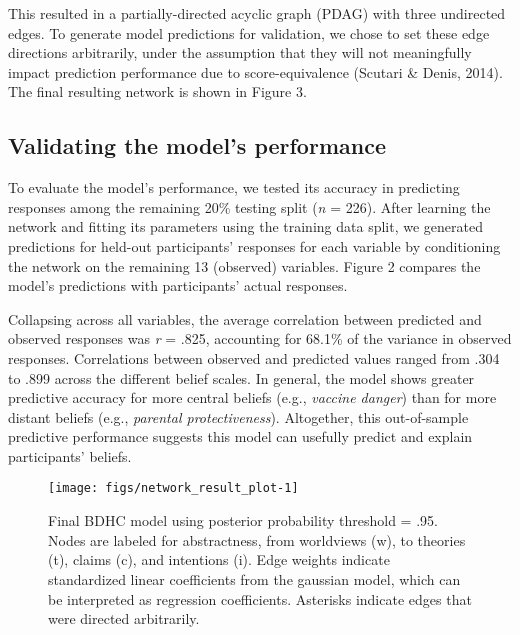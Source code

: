 \documentclass[10pt, letterpaper]{article}
\newenvironment{CodeChunk}{}{}
\begin{document}
This resulted in a partially-directed acyclic graph (PDAG) with three
undirected edges. To generate model predictions for validation, we chose
to set these edge directions arbitrarily, under the assumption that they
will not meaningfully impact prediction performance due to
score-equivalence (Scutari \& Denis, 2014). The final resulting network
is shown in Figure 3.

\subsection{Validating the model's
performance}\label{validating-the-models-performance}

To evaluate the model's performance, we tested its accuracy in
predicting responses among the remaining 20\% testing split (\emph{n} =
226). After learning the network and fitting its parameters using the
training data split, we generated predictions for held-out participants'
responses for each variable by conditioning the network on the remaining
13 (observed) variables. Figure 2 compares the model's predictions with
participants' actual responses.

Collapsing across all variables, the average correlation between
predicted and observed responses was \emph{r} = .825, accounting for
68.1\% of the variance in observed responses. Correlations between
observed and predicted values ranged from .304 to .899 across the
different belief scales. In general, the model shows greater predictive
accuracy for more central beliefs (e.g., \emph{vaccine danger}) than for
more distant beliefs (e.g., \emph{parental protectiveness}). Altogether,
this out-of-sample predictive performance suggests this model can
usefully predict and explain participants' beliefs.

\begin{CodeChunk}
\begin{figure*}[h]

{\centering \texttt{[image: figs/network\_result\_plot-1]} 

}

\caption[Final BDHC model using posterior probability threshold = .95]{Final BDHC model using posterior probability threshold = .95. Nodes are labeled for abstractness, from worldviews (w), to theories (t), claims (c), and intentions (i). Edge weights indicate standardized linear coefficients from the gaussian model, which can be interpreted as regression coefficients. Asterisks indicate edges that were directed arbitrarily.}\label{fig:network_result_plot}
\end{figure*}
\end{CodeChunk}
\end{document}
